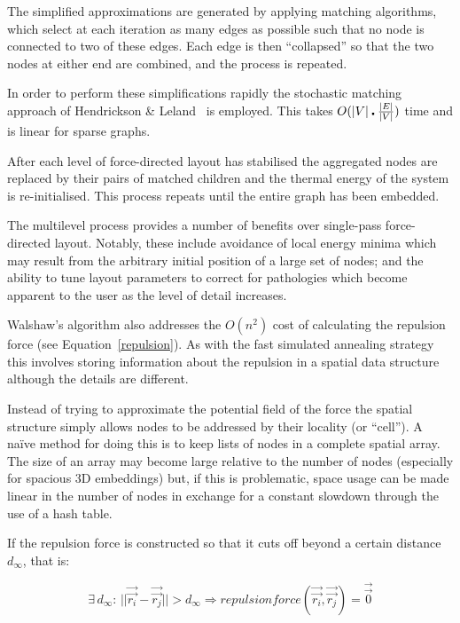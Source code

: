 \documentclass[runningheads]{cl2emult}
\newcommand{\avec}[1]{\vec{\overrightarrow{ #1}}}
\begin{document}
The simplified approximations are generated by applying matching algorithms,
which select at each iteration as many edges as possible such that
no node is connected to two of these edges.  Each edge is then ``collapsed''
so that the two nodes at either end are combined, and the process is repeated.

In order to perform these simplifications rapidly the stochastic matching
approach of Hendrickson \& Leland~\cite{hendrickson95multilevel} is employed.
This takes $O(|V| \centerdot {|E| \over |V|})$ time and is linear for
sparse graphs.

After each level of force-directed layout has stabilised the aggregated
nodes are replaced by their pairs of matched children and the thermal energy
of the system is re-initialised.  This process repeats until the entire graph
has been embedded.

The multilevel process provides a number of benefits over single-pass
force-directed layout.  Notably, these include avoidance of local energy minima
which may result from the arbitrary initial position of a large set of nodes;
and the ability to tune layout parameters to correct for pathologies which
become apparent to the user as the level of detail increases.

Walshaw's algorithm also addresses the $O(n^2)$ cost of calculating the
repulsion force (see Equation~\ref{repulsion}).  As with the fast simulated
annealing strategy this involves storing information about the repulsion in
a spatial data structure although the details are different.

Instead of trying to approximate the potential field of the force the
spatial structure simply allows nodes to be addressed by their locality (or
``cell'').  A na\"{i}ve method for doing this is to keep lists of nodes in a
complete spatial array.  The size of an array may become large relative to
the number of nodes (especially for spacious 3D embeddings) but, if this is
problematic, space usage can be made linear in the number of nodes in
exchange for a constant slowdown through the use of a hash table.

If the repulsion force is constructed so that it cuts off beyond a certain
distance $d_\infty$, that is:

\begin{equation}
\exists \, d_\infty : \, 
||\avec{r_i} - \avec{r_j}|| > d_\infty
\Rightarrow 
repulsionforce (\avec{r_i},\avec{r_j}) = \avec{0}
\end{equation}
\end{document}
